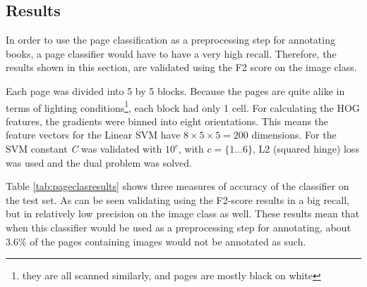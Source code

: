 \subsection{Results}
\label{subsec:pageclasresults}

In order to use the page classification as a preprocessing step for annotating
books, a page classifier would have to have a very high recall. Therefore, the
results shown in this section, are validated using the F2 score on the image
class. 

Each page was divided into 5 by 5 blocks. Because the pages
are quite alike in terms of lighting conditions\footnote{they are all scanned
similarly, and pages are mostly black on white}, each block had only 1 cell. For
calculating the HOG features, the gradients were binned into eight orientations.
This means the feature vectors for the Linear SVM have $8 \times 5 \times 5 =
200$ dimensions. 
For the SVM constant \emph{C} was validated with $10^c$, with $c = \{1 \dots
6\}$, L2 (squared hinge) loss was used and the dual problem was solved. 


Table \ref{tab:pageclasresults} shows three measures of accuracy of the
classifier on the test set. As can be seen validating using the F2-score
results in a big recall, but in relatively low precision on the image
class as well. These results mean that when this classifier would be used as a
preprocessing step for annotating, about $3.6\%$ of the pages containing images
would not be annotated as such.


